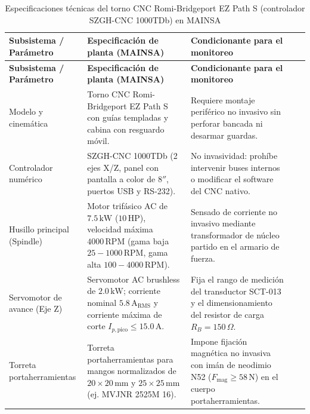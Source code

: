 {\setlength{\parskip}{1.5pt}
\begin{longtable}{L{3.4cm}L{5.2cm}L{5.2cm}}
\caption{Especificaciones técnicas del torno CNC Romi-Bridgeport EZ Path S (controlador SZGH-CNC 1000TDb) en MAINSA}
\label{tab:especificaciones_torno_mainsa}
\\
\hline
\textbf{Subsistema / Parámetro} & \textbf{Especificación de planta (MAINSA)} & \textbf{Condicionante para el monitoreo} \\
\hline \hline
\endfirsthead

\hline
\textbf{Subsistema / Parámetro} & \textbf{Especificación de planta (MAINSA)} & \textbf{Condicionante para el monitoreo} \\
\hline \hline
\endhead

\hline
\endfoot

\endlastfoot

Modelo y cinemática & Torno CNC Romi-Bridgeport EZ Path S con guías templadas y cabina con resguardo móvil. & Requiere montaje periférico no invasivo sin perforar bancada ni desarmar guardas.\\ \hline

Controlador numérico & SZGH-CNC 1000TDb (2 ejes X/Z, panel con pantalla a color de $8''$, puertos USB y RS-232). & No invasividad: prohíbe intervenir buses internos o modificar el software del CNC nativo.\\ \hline

Husillo principal (Spindle) & Motor trifásico AC de $7.5\,\text{kW}$ ($10\,\text{HP}$), velocidad máxima $4000\,\text{RPM}$ (gama baja $25 - 1000\,\text{RPM}$, gama alta $100 - 4000\,\text{RPM}$). & Sensado de corriente no invasivo mediante transformador de núcleo partido en el armario de fuerza.\\ \hline

Servomotor de avance (Eje Z) & Servomotor AC brushless de $2.0\,\text{kW}$; corriente nominal $5.8\,\text{A}_{\text{RMS}}$ y corriente máxima de corte $I_{p,\text{pico}} \le 15.0\,\text{A}$. & Fija el rango de medición del transductor SCT-013 y el dimensionamiento del resistor de carga $R_B = 150\,\Omega$.\\ \hline

Torreta portaherramientas & Torreta portaherramientas para mangos normalizados de $20 \times 20\,\text{mm}$ y $25 \times 25\,\text{mm}$ (ej. MVJNR 2525M 16). & Impone fijación magnética no invasiva con imán de neodimio N52 ($F_{\text{mag}} \ge 58\,\text{N}$) en el cuerpo portaherramientas.\\ \hline


\end{longtable}}
